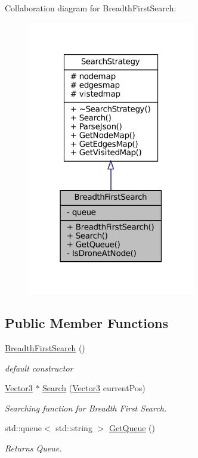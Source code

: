 Collaboration diagram for Breadth\+First\+Search\+:\nopagebreak
\begin{figure}[H]
\begin{center}
\leavevmode
\includegraphics[width=207pt]{classBreadthFirstSearch__coll__graph}
\end{center}
\end{figure}
\subsection*{Public Member Functions}
\begin{DoxyCompactItemize}
\item 
\mbox{\label{classBreadthFirstSearch_a5a9f84e4b10107e8e809349292f6ca76}} 
\hyperlink{classBreadthFirstSearch_a5a9f84e4b10107e8e809349292f6ca76}{Breadth\+First\+Search} ()
\begin{DoxyCompactList}\small\item\em default constructor \end{DoxyCompactList}\item 
\mbox{\label{classBreadthFirstSearch_a69eb7594b796343b19d5f8d4a67516d3}} 
\hyperlink{classVector3}{Vector3} $\ast$ \hyperlink{classBreadthFirstSearch_a69eb7594b796343b19d5f8d4a67516d3}{Search} (\hyperlink{classVector3}{Vector3} current\+Pos)
\begin{DoxyCompactList}\small\item\em Searching function for Breadth First Search. \end{DoxyCompactList}\item 
\mbox{\label{classBreadthFirstSearch_a73ddb06824da940bbb5f8da61cf58419}} 
std\+::queue$<$ std\+::string $>$ \hyperlink{classBreadthFirstSearch_a73ddb06824da940bbb5f8da61cf58419}{Get\+Queue} ()
\begin{DoxyCompactList}\small\item\em Returns Queue. \end{DoxyCompactList}\end{DoxyCompactItemize}
